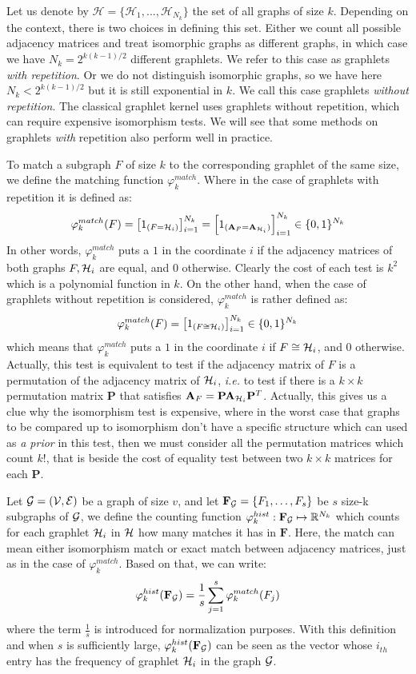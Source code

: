 Let us denote by $\mathcal{H}=\{\mathcal{H}_1,..., \mathcal{H}_{N_k}\}$ the set of all graphs of size $k$. Depending on the context, there is two choices in defining this set. Either we count all possible adjacency matrices and treat isomorphic graphs as different graphs, in which case we have $N_k=2^{k(k-1)/2}$ different graphlets. We refer to this case as graphlets \emph{with repetition}. Or we do not distinguish isomorphic graphs, so we have here $N_k<2^{k(k-1)/2}$ but it is still exponential in $k$. We call this case graphlets \emph{without repetition}. The classical graphlet kernel uses graphlets without repetition, which can require expensive isomorphism tests. We will see that some methods on graphlets \emph{with} repetition also perform well in practice.

To match a subgraph $F$ of size $k$ to the corresponding graphlet of the same size, we define the matching function $\varphi_{k}^{match}$. Where in the case of graphlets with repetition it is defined as: 
\[
\varphi_k^{match}(F) = \left[ 1_{(F = \mathcal{H}_i)}\right]_{i=1}^{N_k}= \left[ 1_{(\mathbf{A}_F = \mathbf{A}_{\mathcal{H}_i})}\right]_{i=1}^{N_k} \in \{0,1\}^{N_k}
\]
In other words, $\varphi_k^{match}$ puts a $1$ in the coordinate $i$ if the adjacency matrices of both graphs $F, \mathcal{H}_i$ are equal, and $0$ otherwise. Clearly the cost of each test is $k^2$ which is a polynomial function in $k$. On the other hand, when the case of graphlets without repetition is considered, $\varphi_k^{match}$ is rather defined as:
\[
\varphi_k^{match}(F) = \left[ 1_{(F \cong \mathcal{H}_i)}\right]_{i=1}^{N_k} \in \{0,1\}^{N_k}
\]
which means that $\varphi_k^{match}$ puts a $1$ in the coordinate $i$ if $F\cong \mathcal{H}_i$, and $0$ otherwise. Actually, this test is equivalent to test if the adjacency matrix of $F$ is a permutation of the adjacency matrix of $\mathcal{H}_i$, \emph{i.e.} to test if there is a $k\times k$ permutation matrix $\mathbf{P}$ that satisfies $\mathbf{A}_{F}=\mathbf{P}\mathbf{A}_{\mathcal{H}_i}\mathbf{P}^T$. Actually, this gives us a clue why the isomorphism test is expensive, where in the worst case that graphs to be compared up to isomorphism don't have a specific structure which can used as \emph{a prior} in this test, then we  must consider all the permutation matrices  which count $k!$, that is beside the cost of equality test between two $k\times k$ matrices for each $\mathbf{P}$.

Let $\mathcal{G}=(\mathcal{V},\mathcal{E})$ be a graph of size $v$, and let $\mathbf{F}_{\mathcal{G}}=\{F_1,\ldots,F_s\}$ be  $s$ size-k subgraphs of $\mathcal{G}$, we define the counting function $\varphi_k^{hist}:\mathbf{F}_{\mathcal{G}}\mapsto \mathbb{R}^{N_k}$ which counts for each graphlet $\mathcal{H}_i$ in $\mathcal{H}$ how many matches it has in $\mathbf{F}$. Here, the match can mean  either isomorphism match or exact match between adjacency matrices, just as in the case of $\varphi_k^{match}$. Based on that, we can write:
\[
\varphi_k^{hist}(\mathbf{F}_{\mathcal{G}})=\frac{1}{s}\sum_{j=1}^s \varphi_k^{match} (F_j)
\]
where the term $\frac{1}{s}$ is introduced for normalization purposes. With this definition and when $s$ is sufficiently large, $\varphi_k^{hist}(\mathbf{F}_{\mathcal{G}})$ can be seen as the vector whose $i_{th}$ entry has the frequency of graphlet $\mathcal{H}_i$ in the graph $\mathcal{G}$.


